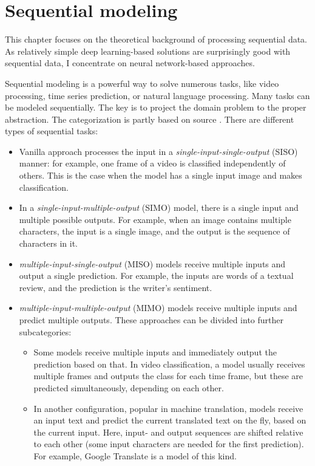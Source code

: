 \chapter{Sequential modeling}

This chapter focuses on the theoretical background of processing sequential data. As relatively simple deep learning-based solutions are surprisingly good with sequential data, I concentrate on neural network-based approaches.

Sequential modeling is a powerful way to solve numerous tasks, like video processing, time series prediction, or natural language processing. Many tasks can be modeled sequentially. The key is to project the domain problem to the proper abstraction. The categorization is partly based on source \cite{SequentialLecture}. There are different types of sequential tasks:

\begin{itemize}
  \item Vanilla approach processes the input in a \textit{single-input-single-output} (SISO) manner: for example, one frame of a video is classified independently of others. This is the case when the model has a single input image and makes classification.
  \item In a \textit{single-input-multiple-output} (SIMO) model, there is a single input and multiple possible outputs. For example, when an image contains multiple characters, the input is a single image, and the output is the sequence of characters in it.
  \item \textit{multiple-input-single-output} (MISO) models receive multiple inputs and output a single prediction. For example, the inputs are words of a textual review, and the prediction is the writer's sentiment.
  \item \textit{multiple-input-multiple-output} (MIMO) models receive multiple inputs and predict multiple outputs. These approaches can be divided into further subcategories:
    \begin{itemize}
        \item Some models receive multiple inputs and immediately output the prediction based on that. In video classification, a model usually receives multiple frames and outputs the class for each time frame, but these are predicted simultaneously, depending on each other.
	   \item In another configuration, popular in machine translation, models receive an input text and predict the current translated text on the fly, based on the current input. Here, input- and output sequences are shifted relative to each other (some input characters are needed for the first prediction). For example, Google Translate is a model of this kind.
    \end{itemize}
\end{itemize}

